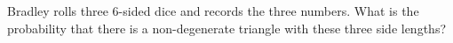 Bradley rolls three 6-sided dice and records the three numbers. What is the probability that there is a non-degenerate triangle with these three side lengths?
